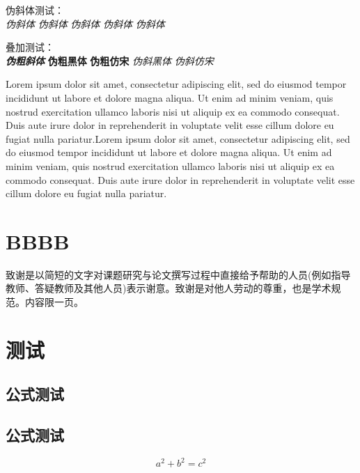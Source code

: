 \documentclass[type = master,class = academic]{whu-thesis}
\begin{document}
伪斜体测试：\\
{\itshape\songti 伪斜体} {\itshape\kaishu 伪斜体} {\itshape\heiti 伪斜体} {\itshape\fangsong 伪斜体} {\itshape 伪斜体}

叠加测试：\\
{\bfseries\itshape 伪粗斜体} {\bfseries\sffamily 伪粗黑体} {\bfseries\ttfamily 伪粗仿宋} {\itshape\sffamily 伪斜黑体} {\itshape\ttfamily 伪斜仿宋}

Lorem ipsum dolor sit amet, consectetur adipiscing elit, sed do eiusmod tempor incididunt ut labore et dolore magna aliqua. Ut enim ad minim veniam, quis nostrud exercitation ullamco laboris nisi ut aliquip ex ea commodo consequat. Duis aute irure dolor in reprehenderit in voluptate velit esse cillum dolore eu fugiat nulla pariatur.Lorem ipsum dolor sit amet, consectetur adipiscing elit, sed do eiusmod tempor incididunt ut labore et dolore magna aliqua. Ut enim ad minim veniam, quis nostrud exercitation ullamco laboris nisi ut aliquip ex ea commodo consequat. Duis aute irure dolor in reprehenderit in voluptate velit esse cillum dolore eu fugiat nulla pariatur.

\chapter{BBBB}


\printbibliography

\begin{acknowledgements}
  致谢是以简短的文字对课题研究与论文撰写过程中直接给予帮助的人员(例如指导教师、答疑教师及其他人员)表示谢意。致谢是对他人劳动的尊重，也是学术规范。内容限一页。
\end{acknowledgements}

\appendix

\chapter{测试}

\section{公式测试}
\section{公式测试}

\begin{equation}
  a^2 + b^2 = c^2
\end{equation}
\end{document}

